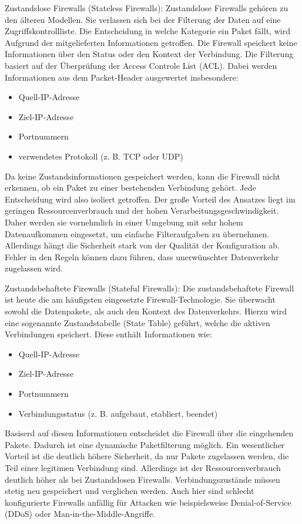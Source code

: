 	Zustandslose Firewalls (Stateless Firewalls): \newline
	Zustandslose Firewalls gehören zu den älteren Modellen. Sie verlassen sich bei der
	Filterung der Daten auf eine Zugriffskontrollliste.
	Die Entscheidung in welche Kategorie ein Paket fällt, wird Aufgrund der mitgelieferten
	Informationen getroffen. Die Firewall speichert keine Informationen über den Status oder den Kontext der
	Verbindung. Die Filterung basiert auf der Überprüfung der Access Controle List (ACL). Dabei werden Informationen
	aus dem Packet-Header ausgewertet insbesondere:
	\begin{itemize}
		\item{Quell-IP-Adresse}
		\item{Ziel-IP-Adresse}
		\item{Portnummern}
		\item{verwendetes Protokoll (z. B. TCP oder UDP)}
	\end{itemize}
	Da keine Zustandsinformationen gespeichert werden, kann die Firewall nicht erkennen, ob ein Paket zu einer bestehenden
	Verbindung gehört. Jede Entscheidung wird also isoliert getroffen.
	Der große Vorteil des Ansatzes liegt im geringen Ressourcenverbrauch und der hohen Verarbeitungsgeschwindigkeit.
	Daher werden sie vornehmlich in einer Umgebung mit sehr hohem Datenaufkommen eingesetzt, um einfache
	Filteraufgaben zu übernehmen.
	Allerdings hängt die Sicherheit stark von der Qualität der Konfiguration ab. Fehler in den Regeln können 
	dazu führen, dass unerwünschter Datenverkehr zugelassen wird.

	Zustandsbehaftete Firewalls (Stateful Firewalls): \newline
	Die zustandsbehaftete Firewall ist heute die am häufigsten eingesetzte Firewall-Technologie.
	Sie überwacht sowohl die Datenpakete, als auch den Kontext des Datenverkehrs.
	Hierzu wird eine sogenannte Zustandstabelle (State Table) geführt, welche die aktiven Verbindungen speichert.
	Diese enthält Informationen wie:
	\begin{itemize}
		\item{Quell-IP-Adresse}
		\item{Ziel-IP-Adresse}
		\item{Portnummern}
		\item{Verbindungsstatus (z. B. aufgebaut, etabliert, beendet)}
	\end{itemize}
	Basiserd auf diesen Informationen entscheidet die Firewall über die eingehenden Pakete.
	Dadurch ist eine dynamische Paketfilterung möglich.
	Ein wesentlicher Vorteil ist die deutlich höhere Sicherheit, da nur Pakete zugelassen werden, 
	die Teil einer legitimen Verbindung sind. 
	Allerdings ist der Ressourcenverbrauch deutlich höher als bei Zustandslosen Firewalls.
	Verbindungszustände müssen stetig neu gespeichert und verglichen werden.
	Auch hier sind schlecht konfigurierte Firewalls anfällig für Attacken wie beispielsweise
	Denial-of-Service (DDoS) oder Man-in-the-Middle-Angriffe.

